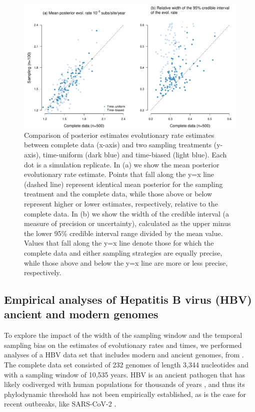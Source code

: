 \documentclass[11pt]{article}
\begin{document}
\begin{figure}[H]
	\begin{center}
		\includegraphics[scale=0.5, angle=0]{sampling_bias_summary_rates.pdf}
		\caption{Comparison of posterior estimates evolutionary rate estimates between complete data (x-axis) and two sampling treatments (y-axis), time-uniform (dark blue) and time-biased (light blue). Each dot is a simulation replicate. In (a) we show the mean posterior evolutionary rate estimate. Points that fall along the y=x line (dashed line) represent identical mean posterior for the sampling treatment and the complete data, while those above or below represent higher or lower estimates, respectively, relative to the complete data. In (b) we show the width of the credible interval (a measure of precision or uncertainty), calculated as the upper minus the lower 95\% credible interval range divided by the mean value. Values that fall along the y=x line denote those for which the complete data and either sampling strategies are equally precise, while those above and below the y=x line are more or less precise, respectively.}
		\label{figure:Fig5}
	\end{center}
\end{figure}

\subsection{Empirical analyses of Hepatitis B virus (HBV) ancient and modern genomes}
To explore the impact of the width of the sampling window and the temporal sampling bias on the estimates of evolutionary rates and times, we performed analyses of a HBV data set that includes modern and ancient genomes, from \cite{kocher2021ten}. The complete data set consisted of 232 genomes of length 3,344 nucleotides and with a sampling window of 10,535 years. HBV is an ancient pathogen that has likely codiverged with human populations for thousands of years \citep{locarnini2021origins, zehender2014enigmatic, paraskevis2013dating, muhlemann2018ancient}, and thus its phylodynamic threshold has not been empirically established, as is the case for recent outbreaks, like SARS-CoV-2 \citep{duchene2020temporal}. 
\end{document}
